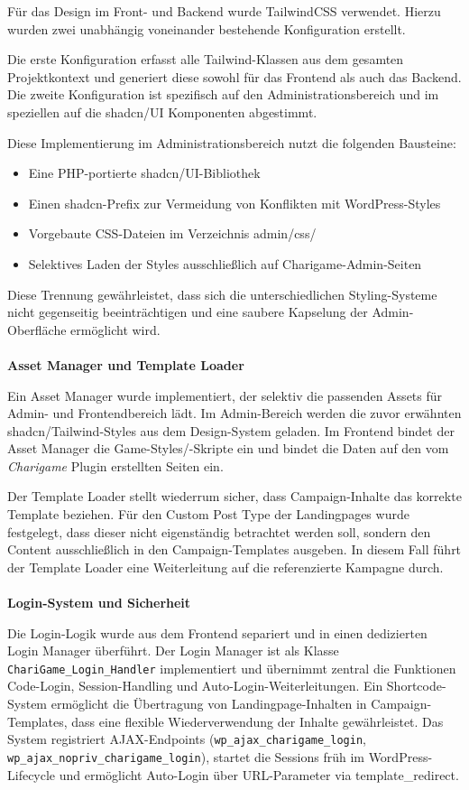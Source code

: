 Für das Design im Front- und Backend wurde TailwindCSS verwendet.
Hierzu wurden zwei unabhängig voneinander bestehende Konfiguration erstellt.

Die erste Konfiguration erfasst alle Tailwind-Klassen aus dem gesamten Projektkontext und generiert diese sowohl für das Frontend als auch das Backend.
Die zweite Konfiguration ist spezifisch auf den Administrationsbereich und im speziellen auf die shadcn/UI Komponenten abgestimmt.

Diese Implementierung im Administrationsbereich nutzt die folgenden Bausteine:
\begin{itemize}
\item Eine PHP-portierte shadcn/UI-Bibliothek
\item Einen shadcn-Prefix zur Vermeidung von Konflikten mit WordPress-Styles
\item Vorgebaute CSS-Dateien im Verzeichnis admin/css/
\item Selektives Laden der Styles ausschließlich auf Charigame-Admin-Seiten
\end{itemize}
Diese Trennung gewährleistet, dass sich die unterschiedlichen Styling-Systeme nicht gegenseitig beeinträchtigen und eine saubere Kapselung der Admin-Oberfläche ermöglicht wird.
\\\\
\textbf{Asset Manager und Template Loader}

Ein Asset Manager wurde implementiert, der selektiv die passenden Assets für Admin- und Frontendbereich lädt.
Im Admin-Bereich werden die zuvor erwähnten shadcn/Tailwind-Styles aus dem Design-System geladen.
Im Frontend bindet der Asset Manager die Game-Styles/-Skripte ein und bindet die Daten auf den vom \textit{Charigame} Plugin erstellten Seiten ein.

Der Template Loader stellt wiederrum sicher, dass Campaign-Inhalte das korrekte Template beziehen.
Für den Custom Post Type der Landingpages wurde festgelegt, dass dieser nicht eigenständig betrachtet werden soll, sondern den Content ausschließlich in den Campaign-Templates ausgeben.
In diesem Fall führt der Template Loader eine Weiterleitung auf die referenzierte Kampagne durch.
\\\\
\textbf{Login-System und Sicherheit}

Die Login-Logik wurde aus dem Frontend separiert und in einen dedizierten Login Manager überführt.
Der Login Manager ist als Klasse \texttt{ChariGame\_Login\_Handler} implementiert und übernimmt zentral die Funktionen Code-Login, Session-Handling und Auto-Login-Weiterleitungen.
Ein Shortcode-System ermöglicht die Übertragung von Landingpage-Inhalten in Campaign-Templates, dass eine flexible Wiederverwendung der Inhalte gewährleistet.
Das System registriert AJAX-Endpoints (\texttt{wp\_ajax\_charigame\_login}, \texttt{wp\_ajax\_nopriv\_charigame\_login}), startet die Sessions früh im WordPress-Lifecycle und ermöglicht Auto-Login über URL-Parameter via template\_redirect.

